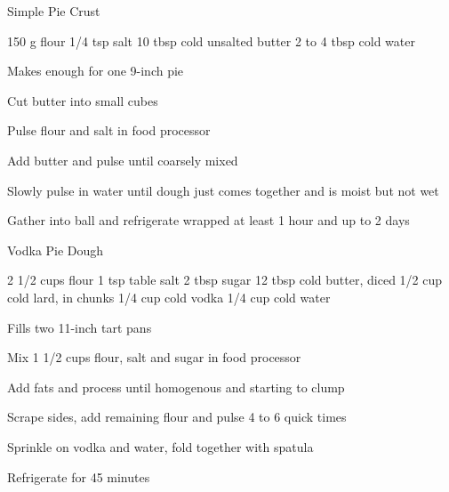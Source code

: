 \begin{recipe}{Simple Pie Crust}{\vegetarian{}}
\begin{ingredients}
150 g flour
1/4 tsp salt
10 tbsp cold unsalted butter
2 to 4 tbsp cold water
\end{ingredients}
\nextcolumn
Makes enough for one 9-inch pie
\begin{steps}
    \item Cut butter into small cubes
    \item Pulse flour and salt in food processor
    \item Add butter and pulse until coarsely mixed
    \item Slowly pulse in water until dough just comes together and is moist but not wet
    \item Gather into ball and refrigerate wrapped at least 1 hour and up to 2 days
\end{steps}
\end{recipe}

\begin{recipe}{Vodka Pie Dough}{\vegetarian{}}
\begin{ingredients}
2 1/2 cups flour
1 tsp table salt
2 tbsp sugar
12 tbsp cold butter, diced
1/2 cup cold lard, in chunks
1/4 cup cold vodka
1/4 cup cold water
\end{ingredients}
\nextcolumn
Fills two 11-inch tart pans
\begin{steps}
    \item Mix 1 1/2 cups flour, salt and sugar in food processor
    \item Add fats and process until homogenous and starting to clump
    \item Scrape sides, add remaining flour and pulse 4 to 6 quick times
    \item Sprinkle on vodka and water, fold together with spatula
    \item Refrigerate for 45 minutes
\end{steps}
\end{recipe}

